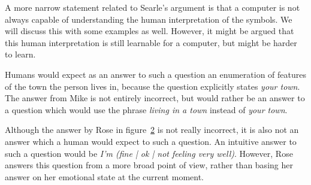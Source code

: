 A more narrow statement related to Searle's argument is that a computer is not always capable of understanding the human interpretation of the symbols. We will discuss this with some examples as well. However, it might be argued that this human interpretation is still learnable for a computer, but might be harder to learn.

\begin{figure}[ht]
   \begin{center}
   \end{center}
   \caption{}
   \label{Example3}
\end{figure}

Humans would expect as an answer to such a question an enumeration of features of the town the person lives in, because the question explicitly states \textit{your town}. The answer from Mike is not entirely incorrect, but would rather be an answer to a question which would use the phrase \textit{living in a town} instead of \textit{your town}.

\begin{figure}[ht]
   \begin{center}
   \end{center}
   \caption{}
   \label{Example4}
\end{figure}

Although the answer by Rose in figure~\ref{Example4} is not really incorrect, it is also not an answer which a human would expect to such a question. An intuitive answer to such a question would be \textit{I'm (fine | ok | not feeling very well)}. However, Rose answers this question from a more broad point of view, rather than basing her answer on her emotional state at the current moment.

